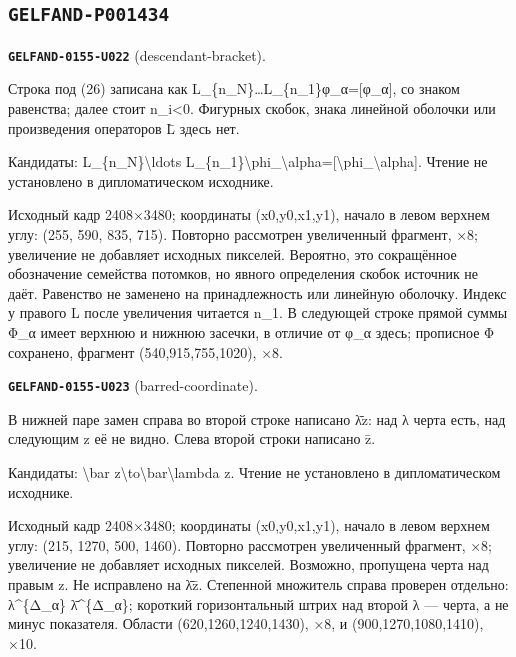 \subsection*{\texttt{GELFAND-P001434}}
\par\noindent\leavevmode{}\label{GELFAND-0155-U022}\label{GELFAND-P001434:descendant-bracket}\textbf{\texttt{GELFAND-0155-U022}} (descendant-bracket).\nopagebreak[4]\par
Строка под (26) записана как L\_\{n\_N\}…L\_\{n\_1\}φ\_α=[φ\_α], со знаком равенства; далее стоит n\_i<0. Фигурных скобок, знака линейной оболочки или произведения операторов L̄ здесь нет.\par
Кандидаты: L\_\{n\_N\}\textbackslash{}ldots L\_\{n\_1\}\textbackslash{}phi\_\textbackslash{}alpha=[\textbackslash{}phi\_\textbackslash{}alpha]. Чтение не установлено в дипломатическом исходнике.\par
Исходный кадр 2408×3480; координаты (x0,y0,x1,y1), начало в левом верхнем углу: (255, 590, 835, 715). Повторно рассмотрен увеличенный фрагмент, ×8; увеличение не добавляет исходных пикселей. Вероятно, это сокращённое обозначение семейства потомков, но явного определения скобок источник не даёт. Равенство не заменено на принадлежность или линейную оболочку. Индекс у правого L после увеличения читается n\_1. В следующей строке прямой суммы Φ\_α имеет верхнюю и нижнюю засечки, в отличие от φ\_α здесь; прописное Φ сохранено, фрагмент (540,915,755,1020), ×8.\par
\medskip
\par\noindent\leavevmode{}\label{GELFAND-0155-U023}\label{GELFAND-P001434:barred-coordinate}\textbf{\texttt{GELFAND-0155-U023}} (barred-coordinate).\nopagebreak[4]\par
В нижней паре замен справа во второй строке написано λ̄z: над λ черта есть, над следующим z её не видно. Слева второй строки написано z̄.\par
Кандидаты: \textbackslash{}bar z\textbackslash{}to\textbackslash{}bar\textbackslash{}lambda z. Чтение не установлено в дипломатическом исходнике.\par
Исходный кадр 2408×3480; координаты (x0,y0,x1,y1), начало в левом верхнем углу: (215, 1270, 500, 1460). Повторно рассмотрен увеличенный фрагмент, ×8; увеличение не добавляет исходных пикселей. Возможно, пропущена черта над правым z. Не исправлено на λ̄z̄. Степенной множитель справа проверен отдельно: λ\textasciicircum{}\{Δ\_α\} λ̄\textasciicircum{}\{Δ̄\_α\}; короткий горизонтальный штрих над второй λ — черта, а не минус показателя. Области (620,1260,1240,1430), ×8, и (900,1270,1080,1410), ×10.\par
\medskip
